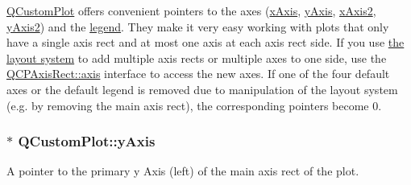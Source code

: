\hyperlink{classQCustomPlot}{\-Q\-Custom\-Plot} offers convenient pointers to the axes (\hyperlink{classQCustomPlot_a9a79cd0158a4c7f30cbc702f0fd800e4}{x\-Axis}, \hyperlink{classQCustomPlot_af6fea5679725b152c14facd920b19367}{y\-Axis}, \hyperlink{classQCustomPlot_ada41599f22cad901c030f3dcbdd82fd9}{x\-Axis2}, \hyperlink{classQCustomPlot_af13fdc5bce7d0fabd640f13ba805c0b7}{y\-Axis2}) and the \hyperlink{classQCustomPlot_a4eadcd237dc6a09938b68b16877fa6af}{legend}. \-They make it very easy working with plots that only have a single axis rect and at most one axis at each axis rect side. \-If you use \hyperlink{}{the layout system} to add multiple axis rects or multiple axes to one side, use the \hyperlink{classQCPAxisRect_a560de44e47a4af0f86c59102a094b1e4}{\-Q\-C\-P\-Axis\-Rect\-::axis} interface to access the new axes. \-If one of the four default axes or the default legend is removed due to manipulation of the layout system (e.\-g. by removing the main axis rect), the corresponding pointers become 0. \hypertarget{classQCustomPlot_af6fea5679725b152c14facd920b19367}{
\subsubsection[{y\-Axis}]{ $\ast$ {\bf \-Q\-Custom\-Plot\-::y\-Axis}}}\label{classQCustomPlot_af6fea5679725b152c14facd920b19367}
\-A pointer to the primary y \-Axis (left) of the main axis rect of the plot.

